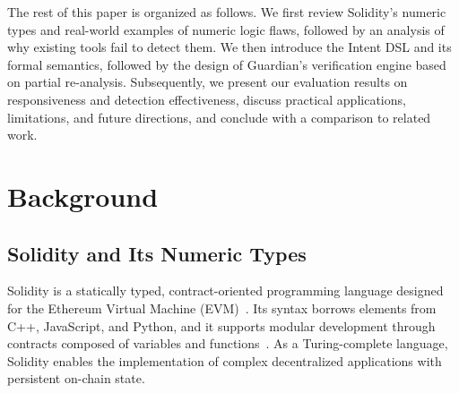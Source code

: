 \documentclass[pdflatex,sn-basic]{sn-jnl}%
\theoremstyle{thmstyleone}%
\theoremstyle{thmstyletwo}%
\theoremstyle{thmstylethree}%
\begin{document}
The rest of this paper is organized as follows.  
We first review Solidity's numeric types and real-world examples of numeric logic flaws, followed by an analysis of why existing tools fail to detect them.  
We then introduce the Intent DSL and its formal semantics, followed by the design of Guardian's verification engine based on partial re-analysis.  
Subsequently, we present our evaluation results on responsiveness and detection effectiveness, discuss practical applications, limitations, and future directions, and conclude with a comparison to related work.


\section{Background}

\begin{table}[!t]
        \centering
        \caption{Distribution of Variable Types in Smart Contract Functions}
        \label{tab:variable_distribution}
    \end{table}

\subsection{Solidity and Its Numeric Types}

Solidity is a statically typed, contract-oriented programming language designed for the Ethereum Virtual Machine (EVM)~\citep{solidity, soldom}. Its syntax borrows elements from C++, JavaScript, and Python, and it supports modular development through contracts composed of variables and functions~\citep{soldom, solinf}. As a Turing-complete language, Solidity enables the implementation of complex decentralized applications with persistent on-chain state.
\end{document}
